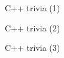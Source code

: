 
\begin{frame}[fragile]{C++ trivia (1)}
\end{frame}

\begin{frame}[fragile]{C++ trivia (2)}
\end{frame}

\begin{frame}[fragile]{C++ trivia (3)}
\end{frame}
